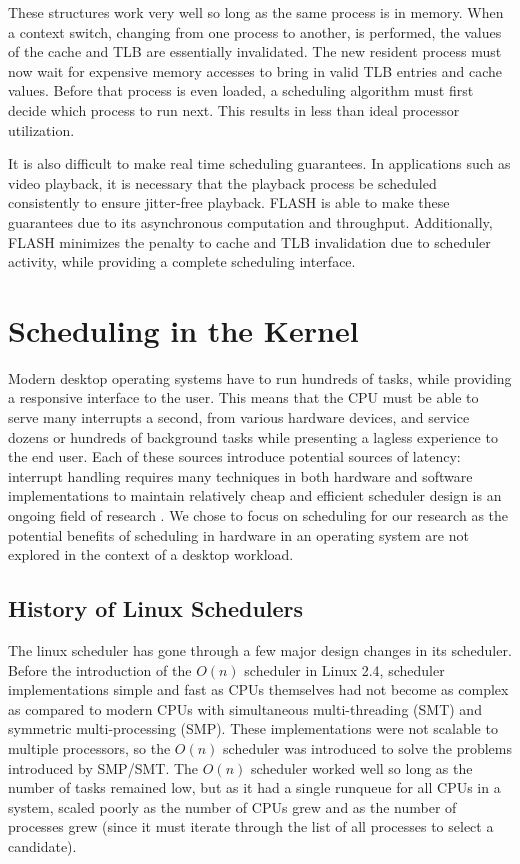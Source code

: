 \documentclass{sig-alternate-10pt}
\begin{document}
These structures work very well so long as the same process is in memory. When a context switch, changing from one process to another, is performed, the values of the cache and TLB are essentially invalidated. The new resident process must now wait for expensive memory accesses to bring in valid TLB entries and cache values. Before that process is even loaded, a scheduling algorithm must first decide which process to run next. This results in less than ideal processor utilization.

It is also difficult to make real time scheduling guarantees. In applications such as video playback, it is necessary that the playback process be scheduled consistently to ensure jitter-free playback. FLASH is able to make these guarantees due to its asynchronous computation and throughput. Additionally, FLASH minimizes the penalty to cache and TLB invalidation due to scheduler activity, while providing a complete scheduling interface.

\section{Scheduling in the Kernel}
\label{sec:sched_in_kernel}
Modern desktop operating systems have to run hundreds of tasks, while providing a responsive interface to the user. This means that the CPU must be able to serve many interrupts a second, from various hardware devices, and service dozens or hundreds of background tasks while presenting a lagless experience to the end user. Each of these sources introduce potential sources of latency: interrupt handling \cite{regehr2007safe} requires many techniques in both hardware and software implementations to maintain relatively cheap and efficient scheduler design is an ongoing field of research \cite{wong2008cfs} \cite{park2008hardware} \cite{morton2004hardware}. We chose to focus on scheduling for our research as the potential benefits of scheduling in hardware in an operating system are not explored in the context of a desktop workload.

\subsection{History of Linux Schedulers}
The linux scheduler has gone through a few major design changes in its scheduler. Before the introduction of the $ O(n) $ scheduler in Linux 2.4, scheduler implementations simple and fast as CPUs themselves had not become as complex as compared to modern CPUs with simultaneous multi-threading (SMT) and symmetric multi-processing (SMP). These implementations were not scalable to multiple processors, so the $ O(n) $ scheduler was introduced to solve the problems introduced by SMP/SMT. The $ O(n) $ scheduler worked well so long as the number of tasks remained low, but as it had a single runqueue for all CPUs in a system, scaled poorly as the number of CPUs grew and as the number of processes grew (since it must iterate through the list of all processes to select a candidate).
\end{document}
